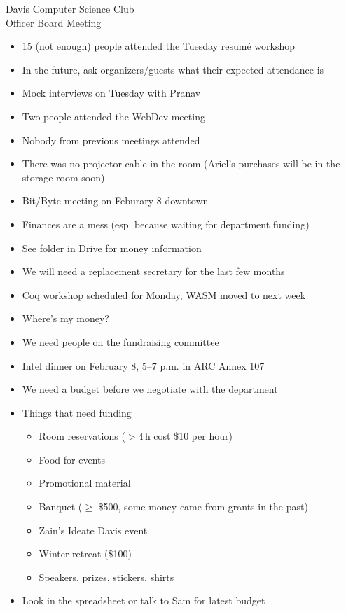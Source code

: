 \documentclass{article}
\begin{document}
\begin{Minutes}{Davis Computer Science Club\\Officer Board Meeting}
\begin{itemize}
\item 15 (not enough) people attended the Tuesday resum\'e workshop
\item In the future, ask organizers/guests what their expected attendance is
\item Mock interviews on Tuesday with Pranav
\end{itemize}
\begin{itemize}
\item Two people attended the WebDev meeting
\item Nobody from previous meetings attended
\item There was no projector cable in the room (Ariel's purchases will be in the
  storage room soon)
\item Bit/Byte meeting on Feburary 8 downtown
\end{itemize}
\begin{itemize}
\item Finances are a mess (esp. because waiting for department funding)
\item See folder in Drive for money information
\end{itemize}
\begin{itemize}
\item We will need a replacement secretary for the last few months
\item Coq workshop scheduled for Monday, WASM moved to next week
\end{itemize}
\begin{itemize}
\item Where's my money?
\end{itemize}
\begin{itemize}
\item We need people on the fundraising committee
\item Intel dinner on February 8, 5--7 p.m. in ARC Annex 107
\end{itemize}
\begin{itemize}
\item We need a budget before we negotiate with the department
\item Things that need funding
  \begin{itemize}
  \item Room reservations ($\gt 4\,\text{h}$ cost \$10 per hour)
  \item Food for events
  \item Promotional material
  \item Banquet ($\ge$ \$500, some money came from grants in the past)
  \item Zain's Ideate Davis event
  \item Winter retreat (\$100)
  \item Speakers, prizes, stickers, shirts
  \end{itemize}
\item Look in the spreadsheet or talk to Sam for latest budget
\end{itemize}
\thispagestyle{creditfooter}
\end{Minutes}
\end{document}
